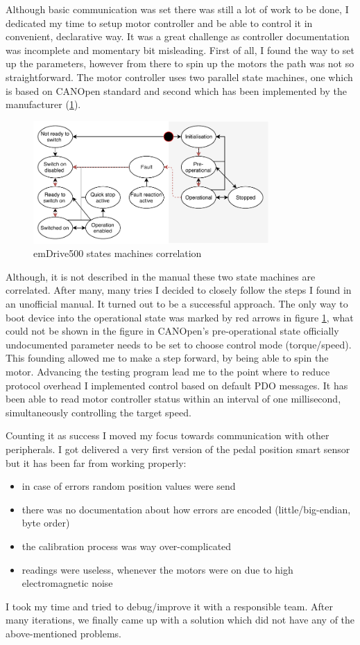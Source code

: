 Although basic communication was set there was still a lot of work to be done, I dedicated my time to setup motor controller and be able to control it in convenient, declarative way.
It was a great challenge as controller documentation was incomplete and momentary bit misleading. First of all, I found the way to set up the parameters, however from there to spin up the motors the path was not so straightforward. 
The motor controller uses two parallel state machines, one which is based on CANOpen standard and second which has been implemented by the manufacturer (\ref{fig:em500_states}). 
\begin{figure}[H]
    \centering
    \includegraphics[width=0.8\textwidth]{figures/em500_state}
    \caption{emDrive500 states machines correlation}
    \label{fig:em500_states}
\end{figure}
Although, it is not described in the manual these two state machines are correlated. After many, many tries I decided to closely follow the steps I found in an unofficial manual. It turned out to be a successful approach. The only way to boot device into the operational state was marked by red arrows in figure \ref{fig:em500_states}, what could not be shown in the figure in CANOpen's pre-operational state officially undocumented parameter needs to be set to choose control mode (torque/speed). This founding allowed me to make a step forward, by being able to spin the motor.
Advancing the testing program lead me to the point where to reduce protocol overhead I implemented control based on default PDO messages. It has been able to read motor controller status within an interval of one millisecond, simultaneously controlling the target speed.

Counting it as success I moved my focus towards communication with other peripherals. I got delivered a very first version of the pedal position smart sensor but it has been far from working properly:
\begin{itemize}
    \item in case of errors random position values were send
    \item there was no documentation about how errors are encoded (little/big-endian, byte order)
    \item the calibration process was way over-complicated
    \item readings were useless, whenever the motors were on due to high electromagnetic noise
\end{itemize} 
I took my time and tried to debug/improve it with a responsible team. After many iterations, we finally came up with a solution which did not have any of the above-mentioned problems.

